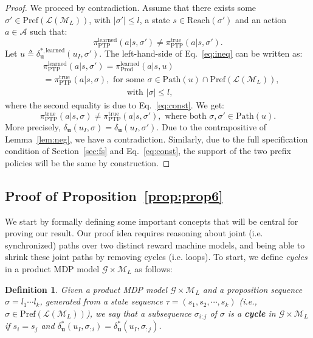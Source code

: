 \documentclass[letterpaper, 10 pt, conference]{ieeeconf}
\newcommand{\lnm}{\mathcal{L}(\mathcal{M}_L)}
\newtheorem{definition}{\textbf{Definition}}
\newcommand{\ptp}{\pi_{\mathrm{PTP}}}
\newcommand{\plnm}{\mathrm{Pref}(\lnm)}
\newcommand{\sectionref}[1]{Section~\ref{#1}}
\begin{document}
\begin{proof}
    We proceed by contradiction. Assume that there exists some $\sigma' \in \mathrm{Pref}(\lnm)$, with $|\sigma'| \leq l$, a state $s \in \mathrm{Reach}(\sigma')$ and an action $a \in \mathcal{A}$ such that:
    \begin{equation}\label{eq:ineq}
        \ptp^{\mathrm{learned}}(a|s,\sigma') \neq \ptp^{\mathrm{true}}(a|s,\sigma').
    \end{equation}
    Let $u \triangleq  \delta_{\textbf{u}}^{*,\mathrm{learned}}(u_I, \sigma')$. The left-hand-side of Eq.~\eqref{eq:ineq} can be written as:
    \begin{align*}
         &\ptp^{\mathrm{learned}}(a|s,\sigma') = \pi_{\mathrm{Prod}}^{\mathrm{learned}}(a|s,u) \\
         &= \ptp^{\mathrm{true}}(a|s,\sigma), \text{ for some } \sigma \in \mathrm{Path}(u)\cap \plnm, \\
         & \hspace{4cm} \text{ with }|\sigma| \leq l,
    \end{align*}
    where the second equality is due to Eq.~\eqref{eq:const}. We get:
    \begin{equation*}
        \ptp^{\mathrm{true}}(a|s,\sigma) \neq \ptp^{\mathrm{true}}(a|s,\sigma'), \text{ where both } \sigma, \sigma' \in \mathrm{Path}(u). 
    \end{equation*}
    More precisely, $\delta_{\mathbf{u}}(u_I,\sigma) = \delta_{\mathbf{u}}(u_I,\sigma')$. Due to the contrapositive of Lemma~\ref{lem:neg}, we have a contradiction. Similarly, due to the full specification condition of \sectionref{sec:fs} and Eq.~\eqref{eq:const}, the support of the two prefix policies will be the same by construction. 
\end{proof}

\subsection{Proof of Proposition~\ref{prop:prop6}}\label{app:proof_prop6}
We start by formally defining some important concepts that will be central for proving our result. Our proof idea requires reasoning about joint (i.e. synchronized) paths over two distinct reward machine models, and being able to shrink these joint paths by removing cycles (i.e. loops). To start, we define \emph{cycles} in a product MDP model $\mathcal{G}\times \mathcal{M}_L$ as follows: 
\begin{definition}
    Given a product MDP model $\mathcal{G}\times \mathcal{M}_L$ and a proposition sequence $\sigma = l_1 \cdots l_k$, generated from a state sequence $\tau = (s_1,s_2,\cdots, s_k)$ (i.e., $\sigma \in \plnm$), we say that a subsequence $\sigma_{i:j}$ of $\sigma$ is a \textbf{cycle} in $\mathcal{G}\times \mathcal{M}_L$ if $s_i = s_j$ and $\delta_{\textbf{u}}^*(u_I,\sigma_{:i}) = \delta_{\textbf{u}}^*(u_I,\sigma_{:j})$.
\end{definition}
  
\end{document}
